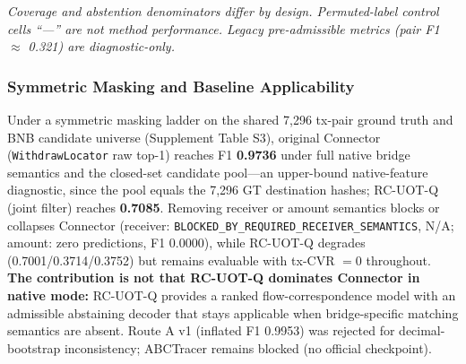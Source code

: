 \begin{table}[!t]
\caption{Fixed-delay RC-UOT-Q main results (full anchor pairs; decode-only; transport frozen).}
\label{tab:fixeddelay}
\centering
\footnotesize
{}
\end{table}

\emph{Coverage and abstention denominators differ by design. Permuted-label control cells ``---'' are not method performance. Legacy pre-admissible metrics (pair F1 $\approx$ 0.321) are diagnostic-only.}

\subsubsection{Symmetric Masking and Baseline Applicability}
\label{sec:maskingladder}

Under a symmetric masking ladder on the shared 7{,}296 tx-pair ground truth and BNB candidate universe (Supplement Table S3), original Connector (\texttt{WithdrawLocator} raw top-1) reaches F1 \textbf{0.9736} under full native bridge semantics and the closed-set candidate pool---an upper-bound native-feature diagnostic, since the pool equals the 7{,}296 GT destination hashes; RC-UOT-Q (joint filter) reaches \textbf{0.7085}. Removing receiver or amount semantics blocks or collapses Connector (receiver: \texttt{BLOCKED\_BY\_REQUIRED\_RECEIVER\_SEMANTICS}, N/A; amount: zero predictions, F1 0.0000), while RC-UOT-Q degrades (0.7001/0.3714/0.3752) but remains evaluable with tx-CVR $=0$ throughout. \textbf{The contribution is not that RC-UOT-Q dominates Connector in native mode:} RC-UOT-Q provides a ranked flow-correspondence model with an admissible abstaining decoder that stays applicable when bridge-specific matching semantics are absent. Route A v1 (inflated F1 0.9953) was rejected for decimal-bootstrap inconsistency; ABCTracer remains blocked (no official checkpoint).

